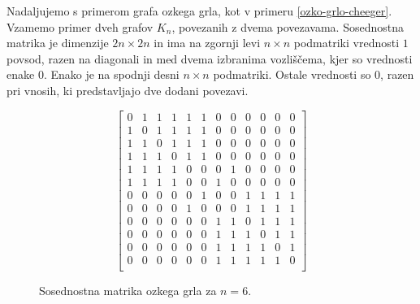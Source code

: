 \begin{primer}\label{ozko-grlo-lv}
    Nadaljujemo s primerom grafa ozkega grla, kot v primeru \ref{ozko-grlo-cheeger}. Vzamemo primer dveh grafov \(K_n\), povezanih z dvema povezavama. Sosednostna matrika je dimenzije \(2n \times 2n\) in ima na zgornji levi \(n\times n\) podmatriki vrednosti \(1\) povsod, razen na diagonali in med dvema izbranima vozliščema, kjer so vrednosti enake \(0\). Enako je na spodnji desni \(n\times n\) podmatriki. Ostale vrednosti so \(0\), razen pri vnosih, ki predstavljajo dve dodani povezavi.
\begin{figure}[t]
    \centering
    \[
        \begin{bmatrix}
            0 & 1 & 1 & 1 & 1 & 1 & 0 & 0 & 0 & 0 & 0 & 0 \\
            1 & 0 & 1 & 1 & 1 & 1 & 0 & 0 & 0 & 0 & 0 & 0 \\
            1 & 1 & 0 & 1 & 1 & 1 & 0 & 0 & 0 & 0 & 0 & 0 \\
            1 & 1 & 1 & 0 & 1 & 1 & 0 & 0 & 0 & 0 & 0 & 0 \\
            1 & 1 & 1 & 1 & 0 & 0 & 0 & 1 & 0 & 0 & 0 & 0 \\
            1 & 1 & 1 & 1 & 0 & 0 & 1 & 0 & 0 & 0 & 0 & 0 \\
            0 & 0 & 0 & 0 & 0 & 1 & 0 & 0 & 1 & 1 & 1 & 1 \\
            0 & 0 & 0 & 0 & 1 & 0 & 0 & 0 & 1 & 1 & 1 & 1 \\
            0 & 0 & 0 & 0 & 0 & 0 & 1 & 1 & 0 & 1 & 1 & 1 \\
            0 & 0 & 0 & 0 & 0 & 0 & 1 & 1 & 1 & 0 & 1 & 1 \\
            0 & 0 & 0 & 0 & 0 & 0 & 1 & 1 & 1 & 1 & 0 & 1 \\
            0 & 0 & 0 & 0 & 0 & 0 & 1 & 1 & 1 & 1 & 1 & 0 \\
        \end{bmatrix}
    \]
    \caption{Sosednostna matrika ozkega grla za \(n=6\).}
\end{figure}


\end{primer}

